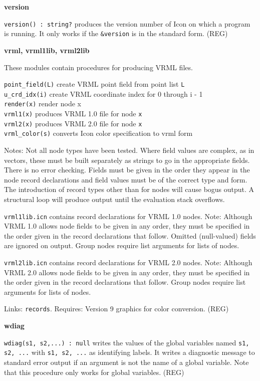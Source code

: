 {\sffamily\bfseries
version}

\texttt{version}\texttt{() : string?} produces the
version number of Icon on which a program is running. It only works if
the \texttt{\&version} is in the standard form. (REG)

{\sffamily\bfseries
vrml, vrml1lib, vrml2lib}

These modules contain procedures for producing VRML files.

\texttt{point\_field(L)} create VRML point field from point list
\texttt{L\\
u\_crd\_idx(i)} create VRML coordinate index for 0 through i - 1\\
\texttt{render(x)} render node x\\
\texttt{vrml1(x)} produces VRML 1.0 file for node \texttt{x\\
vrml2(x)} produces VRML 2.0 file for node \texttt{x\\
vrml\_color(s)} converts Icon color specification to vrml form

Notes: Not all node types have been tested. Where field values are
complex, as in vectors, these must be built separately as strings to go
in the appropriate fields. There is no error checking. Fields must be
given in the order they appear in the node record declarations and
field values must be of the correct type and form. The introduction of
record types other than for nodes will cause bogus output. A structural
loop will produce output until the evaluation stack
overflows.

\texttt{vrml1lib.icn} contains record declarations for VRML 1.0 nodes.
Note: Although VRML 1.0 allows node fields to be given in any order,
they must be specified in the order given in the record declarations
that follow. Omitted (null-valued) fields are ignored on output. Group
nodes require list arguments for lists of nodes.

\texttt{vrml2lib.icn} contains record declarations for VRML 2.0 nodes.
Note: Although VRML 2.0 allows node fields to be given in any order,
they must be specified in the order given in the record declarations
that follow. Group nodes require list arguments for lists of nodes. 

Links: \texttt{records}. Requires: Version 9 graphics for color
conversion. (REG)

{\sffamily\bfseries
wdiag}

\texttt{wdiag(s1, s2,...) : null} writes the values of the global
variables named \texttt{s1, s2, ...} with \texttt{s1, s2, ...} as
identifying labels. It writes a diagnostic message to standard error
output if an argument is not the name of a global variable. Note that
this procedure only works for global variables. (REG)

